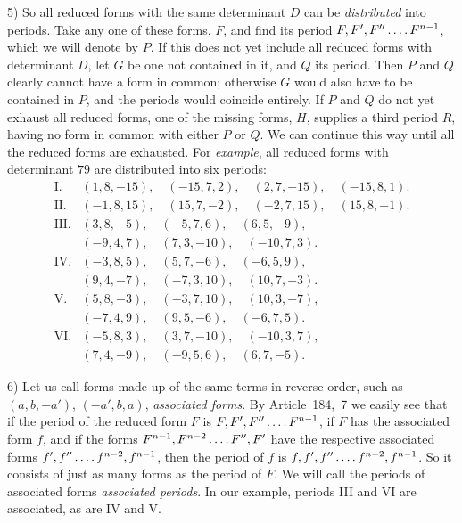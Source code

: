 5) So all reduced forms with the same determinant $D$ can be \textit{distributed} into periods. Take any one of these forms, $F$, and find its period $F,F',F''\mathinner{\ldotp\ldotp\ldotp\ldotp} F^{n-1}$, which we will denote by $P$. If this does not yet include all reduced forms with determinant $D$, let $G$ be one not contained in it, and $Q$ its period. Then $P$ and $Q$ clearly cannot have a form in common; otherwise $G$ would also have to be contained in $P$, and the periods would coincide entirely. If $P$ and $Q$ do not yet exhaust all reduced forms, one of the missing forms, $H$, supplies a third period $R$, having no form in common with either $P$ or $Q$. We can continue this way until all the reduced forms are exhausted. For \textit{example}, all reduced forms with determinant $79$ are distributed into six periods:
\[
\begin{array}{rl}
\mathrm{I.}&(1,8,-15),\quad (-15,7,2),\quad (2,7,-15),\quad (-15,8,1).\\
\mathrm{II.}&(-1,8,15),\quad (15,7,-2),\quad (-2,7,15),\quad (15,8,-1).\\
\mathrm{III.}&(3,8,-5),\quad (-5,7,6),\quad (6,5,-9),\\
&(-9,4,7),\quad (7,3,-10),\quad (-10,7,3).\\
\mathrm{IV.}&(-3,8,5),\quad (5,7,-6),\quad (-6,5,9),\\
&(9,4,-7),\quad (-7,3,10),\quad (10,7,-3).\\
\mathrm{V.}&(5,8,-3),\quad (-3,7,10),\quad (10,3,-7),\\
&(-7,4,9),\quad (9,5,-6),\quad (-6,7,5).\\
\mathrm{VI.}&(-5,8,3),\quad (3,7,-10),\quad (-10,3,7),\\
&(7,4,-9),\quad (-9,5,6),\quad (6,7,-5).
\end{array}
\]

6) Let us call forms made up of the same terms in reverse order, such as $(a,b,-a')$, $(-a',b,a)$, \textit{associated forms}. By Article~184,~7 we easily see that if the period of the reduced form $F$ is $F,F',F''\mathinner{\ldotp\ldotp\ldotp\ldotp} F^{n-1}$, if $F$ has the associated form $f$, and if the forms $F^{n-1},F^{n-2}\mathinner{\ldotp\ldotp\ldotp\ldotp} F'',F'$ have the respective associated forms $f',f''\mathinner{\ldotp\ldotp\ldotp\ldotp} f^{n-2},f^{n-1}$, then the period of $f$ is $f,f',f''\mathinner{\ldotp\ldotp\ldotp\ldotp} f^{n-2},f^{n-1}$. So it consists of just as many forms as the period of $F$. We will call the periods of associated forms \textit{associated periods}. In our example, periods III and VI are associated, as are IV and V.

